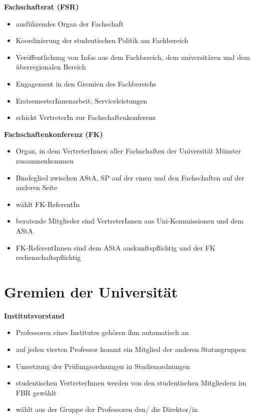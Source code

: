 \textbf{Fachschaftsrat (FSR)} 
\begin{itemize}
  \item ausführendes Organ der Fachschaft
  \item Koordinierung der studentischen Politik am Fachbereich
  \item Veröffentlichung von Infos aus dem Fachbereich, dem universitären und dem überregionalen Bereich
  \item Engagement in den Gremien des Fachbereichs
  \item ErstsemesterInnenarbeit, Serviceleistungen
  \item schickt VertreterIn zur Fachschaftenkonferenz
\end{itemize}

\textbf{Fachschaftenkonferenz (FK)} 
\begin{itemize}
  \item Organ, in dem VertreterInnen aller Fachschaften der Universität Münster zusammenkommen
  \item Bindeglied zwischen AStA, SP auf der einen und den Fachschaften auf der anderen Seite
  \item wählt FK-ReferentIn
  \item beratende Mitglieder sind VertreterInnen aus Uni-Kommissionen und dem AStA
  \item FK-ReferentInnen sind dem AStA auskunftspflichtig und der FK rechenschaftspflichtig
\end{itemize}

\section{Gremien der Universität}

\textbf{Institutsvorstand}
\begin{itemize}
 \item Professoren eines Institutes gehören ihm automatisch an
 \item auf jeden vierten Professor  kommt ein Mitglied der anderen Statusgruppen
 \item Umsetzung der Prüfungsordnungen in Studienordnungen 
  \item studentischen VertreterInnen werden von den studentischen Mitgliedern im FBR gewählt
  \item wählt aus der Gruppe der Professoren den/ die Direktor/in
\end{itemize}

